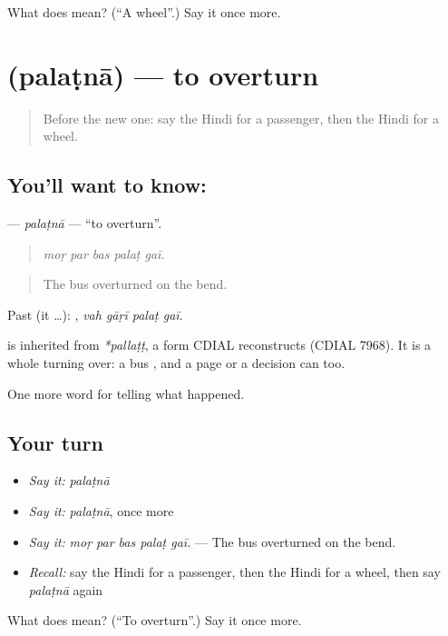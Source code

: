 \begin{tcolorbox}[breakable,colback=teal!4,colframe=teal!35!black,title={Before you move on}]
What does  mean? (\textquotedblleft{}A wheel\textquotedblright{}.) Say it once more.
\end{tcolorbox}
\section[\texorpdfstring{\hi{पलटना} (palaṭnā)}{पलटना (palaṭnā)}]{ (palaṭnā) — to overturn}

\label{lesson:HI-C296-palatna}



\begin{quote}
Before the new one: say the Hindi for a passenger, then the Hindi for a wheel.
\end{quote}

\subsection*{You'll want to know: }
\textbf{} — \emph{palaṭnā} — \textquotedblleft{}to overturn\textquotedblright{}.

\begin{quote}
    
\end{quote}

\begin{quote}
\emph{moṛ par bas palaṭ gaī.}
\end{quote}

\begin{quote}
The bus overturned on the bend.
\end{quote}

Past (it …):    , \emph{vah gāṛī palaṭ gaī}.

\begin{cousinweb}
is inherited from \emph{*pallaṭṭ}, a form CDIAL reconstructs (CDIAL 7968). It is a whole turning over: a bus \textbf{ }, and a page or a decision can \textbf{} too.
\end{cousinweb}

\begin{grammarlens}[title={What you've built}]
One more word for telling what happened.
\end{grammarlens}

\subsection*{Your turn}
\begin{itemize}
\raggedright
  \item \emph{Say it:} \emph{palaṭnā}
  \item \emph{Say it:} \emph{palaṭnā}, once more
  \item \emph{Say it:} \emph{moṛ par bas palaṭ gaī.} — The bus overturned on the bend.
  \item \emph{Recall:} say the Hindi for a passenger, then the Hindi for a wheel, then say \emph{palaṭnā} again
\end{itemize}

\begin{tcolorbox}[breakable,colback=teal!4,colframe=teal!35!black,title={Before you move on}]
What does  mean? (\textquotedblleft{}To overturn\textquotedblright{}.) Say it once more.
\end{tcolorbox}
